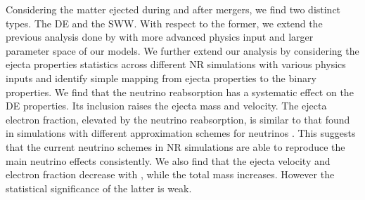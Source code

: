 Considering the matter ejected during and after mergers, we find 
two distinct types. The \ac{DE} and the \pmerg{} \ac{SWW}. 
With respect to the former, we extend the previous analysis done by \citet{Radice:2018pdn} 
with 
more advanced physics input and larger parameter space of our models.
We further extend our analysis by considering the ejecta properties 
statistics across different \ac{NR} simulations with various physics inputs 
and identify simple mapping from ejecta properties to the 
binary properties.
%
%
We find that the neutrino reabsorption has a systematic effect on the \ac{DE} properties.
Its inclusion raises the ejecta mass and velocity.
The ejecta electron fraction, elevated by the neutrino reabsorption, is similar to that 
found in simulations with different approximation schemes for neutrinos
\citep{Sekiguchi:2016bjd,Vincent:2019kor}. 
This suggests that the current neutrino schemes in \ac{NR} simulations are able to 
reproduce the main neutrino effects consistently.
We also find that the ejecta velocity and electron fraction decrease with \mr{}, while 
the total mass increases. However the statistical significance of the latter is weak.

